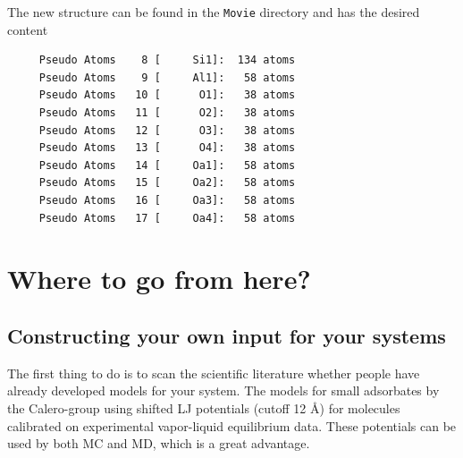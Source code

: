 The new structure can be found in the \verb+Movie+ directory and has the desired content
\begin{tiny}
\begin{verbatim}
     Pseudo Atoms    8 [     Si1]:  134 atoms
     Pseudo Atoms    9 [     Al1]:   58 atoms
     Pseudo Atoms   10 [      O1]:   38 atoms
     Pseudo Atoms   11 [      O2]:   38 atoms
     Pseudo Atoms   12 [      O3]:   38 atoms
     Pseudo Atoms   13 [      O4]:   38 atoms
     Pseudo Atoms   14 [     Oa1]:   58 atoms
     Pseudo Atoms   15 [     Oa2]:   58 atoms
     Pseudo Atoms   16 [     Oa3]:   58 atoms
     Pseudo Atoms   17 [     Oa4]:   58 atoms
\end{verbatim}
\end{tiny}

\section{Where to go from here?}

\subsection*{Constructing your own input for your systems}

The first thing to do is to scan the scientific literature whether people have already developed models for your system.
The models for small adsorbates by the Calero-group using shifted LJ potentials (cutoff 12 \AA)
for molecules calibrated on experimental vapor-liquid equilibrium data.
These potentials can be used by both MC and MD, which is a great advantage.

